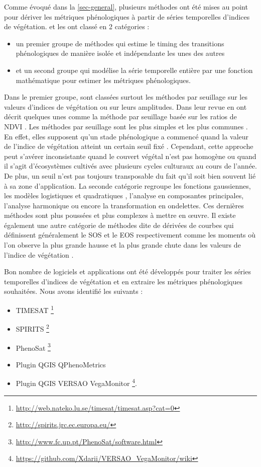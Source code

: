 Comme évoqué dans la \cref{sec-general}, plusieurs méthodes \label{methodes-metriques} ont été mises au point pour dériver les métriques phénologiques à partir de séries temporelles d'indices de végétation.
\citet{Beck2006} et \citet{Atzberger2013} les ont classé en 2 catégories : 
\begin{itemize}
 \item un premier groupe de méthodes qui estime le timing des transitions phénologiques de manière isolée et indépendante les unes des autres
 \item et un second groupe qui modélise la série temporelle entière par une fonction mathématique pour estimer les métriques phénologiques.
\end{itemize}
Dans le premier groupe, sont classées surtout les méthodes par seuillage sur les valeurs d'indices de végétation ou sur leurs amplitudes. Dans leur revue \citet{deBeurs2010} en ont décrit quelques unes comme la méthode par seuillage basée sur les ratios de NDVI \citep{White1997}. Les méthodes par seuillage sont les plus simples et les plus communes \citep{Pan2015}. En effet, elles supposent qu’un stade phénologique a commencé quand 
la valeur de l'indice de végétation atteint un certain seuil fixé \citep{Jonsson2002}. Cependant, cette approche peut s'avérer inconsistante quand le couvert végétal n'est 
pas homogène ou quand il s'agit d'écosystèmes cultivés avec plusieurs cycles culturaux au cours de l'année. De plus, un seuil n'est pas toujours transposable du fait qu'il soit bien souvent lié à sa zone d'application. La seconde catégorie regroupe les fonctions gaussiennes, les modèles logistiques et quadratiques \citep{Zhang2003,Jonsson2004}, l'analyse en composantes principales, l'analyse harmonique ou encore la transformation en ondelettes. Ces dernières méthodes sont plus poussées et plus complexes à mettre en \oe uvre. Il existe également une autre catégorie de méthodes dite de dérivées de courbes qui définissent généralement le SOS et le EOS respectivement comme les moments où l'on observe la plus grande hausse et la plus grande chute dans les valeurs de l'indice de végétation \citep{Moulin1997,Tateishi2004}.

\vspace{5mm}

Bon nombre de logiciels et applications ont été développés pour traiter les séries temporelles d'indices de végétation et en extraire les métriques phénologiques souhaitées. 
Nous avons identifié les suivants :
\begin{itemize}
 \item TIMESAT \footnote{\url{http://web.nateko.lu.se/timesat/timesat.asp?cat=0}} \citep{Eklundh2017} 
 \item SPIRITS \footnote{\url{http://spirits.jrc.ec.europa.eu/}}
 \item PhenoSat \footnote{\url{http://www.fc.up.pt/PhenoSat/software.html}} \citep{Rodrigues2013}
 \item Plugin QGIS QPhenoMetrics \citep{Duarte2018}
 \item Plugin QGIS VERSAO VegaMonitor \footnote{\url{https://github.com/Xdarii/VERSAO_VegaMonitor/wiki}}.
\end{itemize}

